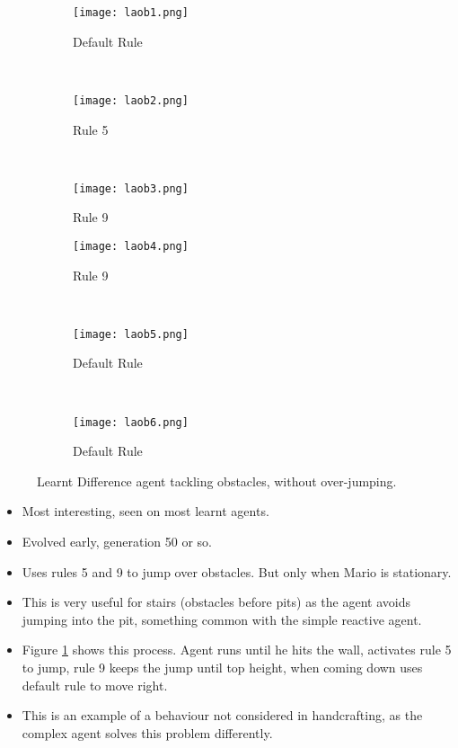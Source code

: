 \begin{figure}[t]
	\begin{adjustwidth}{-2cm}{-2cm}
    \centering
          \begin{subfigure}[b]{0.328\textwidth}
                  \centering
                  \texttt{[image: laob1.png]}
                  \caption{Default Rule}
          \end{subfigure}~
          \begin{subfigure}[b]{0.328\textwidth}
                  \centering
                  \texttt{[image: laob2.png]}
                  \caption{Rule 5}
          \end{subfigure}~
          \begin{subfigure}[b]{0.328\textwidth}
                  \centering
                  \texttt{[image: laob3.png]}
                  \caption{Rule 9}
          \end{subfigure}
          \begin{subfigure}[b]{0.328\textwidth}
                  \centering
                  \texttt{[image: laob4.png]}
                  \caption{Rule 9}
          \end{subfigure}~
          \begin{subfigure}[b]{0.328\textwidth}
                  \centering
                  \texttt{[image: laob5.png]}
                  \caption{Default Rule}
          \end{subfigure}~
          \begin{subfigure}[b]{0.328\textwidth}
                  \centering
                  \texttt{[image: laob6.png]}
                  \caption{Default Rule}
          \end{subfigure}
    \caption{Learnt Difference agent tackling obstacles, without over-jumping.}\label{fig:laob}
    \end{adjustwidth}
\end{figure}

\begin{itemize}
\item Most interesting, seen on most learnt agents.
\item Evolved early, generation 50 or so.
\item Uses rules 5 and 9 to jump over obstacles. But only when Mario is stationary.
\item This is very useful for stairs (obstacles before pits) as the agent avoids jumping into the pit, something common with the simple reactive agent.
\item Figure \ref{fig:laob} shows this process. Agent runs until he hits the wall, activates rule 5 to jump, rule 9 keeps the jump until top height, when coming down uses default rule to move right.
\item This is an example of a behaviour not considered in handcrafting, as the complex agent solves this problem differently.
\end{itemize}

